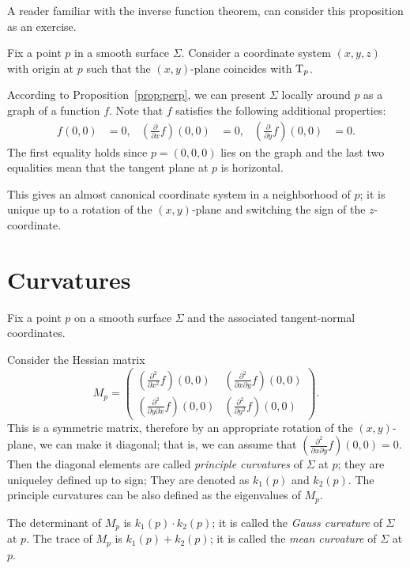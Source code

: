 A reader familiar with the inverse function theorem, can consider this proposition as an exercise.

Fix a point $p$ in a smooth surface $\Sigma$.
Consider a coordinate system $(x,y,z)$ with origin at $p$ such that the $(x,y)$-plane coincides with $\mathrm{T}_p$.

According to Proposition~\ref{prop:perp}, 
we can present $\Sigma$ locally around $p$ as a graph of a function $f$.
Note that $f$ satisfies the following additional properties:
\begin{align*}
f(0,0)&=0,
&
(\tfrac{\partial}{\partial x}f)(0,0)&=0,
&
(\tfrac{\partial}{\partial y}f)(0,0)&=0.
\end{align*}
The first equality holds since $p=(0,0,0)$ lies on the graph and the last two equalities mean that the tangent plane at $p$ is horizontal.

This gives an almost canonical coordinate system in a neighborhood of $p$;
it is unique up to a rotation of  the $(x,y)$-plane and switching the sign of the $z$-coordinate.

\section*{Curvatures}

Fix a point $p$ on a smooth surface $\Sigma$ and the associated tangent-normal coordinates. 

Consider the Hessian matrix 
\[M_p=\begin{pmatrix}
   (\tfrac{\partial^2}{\partial x^2}f)(0,0)
   &(\tfrac{\partial^2}{\partial x\partial y}f)(0,0)
   \\
   (\tfrac{\partial^2}{\partial y\partial x}f)(0,0)
   &(\tfrac{\partial^2}{\partial y^2}f)(0,0)
  \end{pmatrix}.
\]
This is a symmetric matrix, therefore by an appropriate rotation of the $(x,y)$-plane, we can make it diagonal;
that is, we can assume that $(\tfrac{\partial^2}{\partial x\partial y}f)(0,0)=0$.
Then the diagonal elements are called \emph{principle curvatures} of $\Sigma$ at $p$;
they are uniqueley defined up to sign;
They are denoted as $k_1(p)$ and $k_2(p)$.
The principle curvatures can be also defined as the eigenvalues of $M_p$.

The determinant of $M_p$ is $k_1(p)\cdot k_2(p)$;
it is called the \emph{Gauss curvature} of $\Sigma$ at $p$.
The trace of $M_p$ is $k_1(p)+ k_2(p)$;
it is called the \emph{mean curvature} of $\Sigma$ at $p$.

